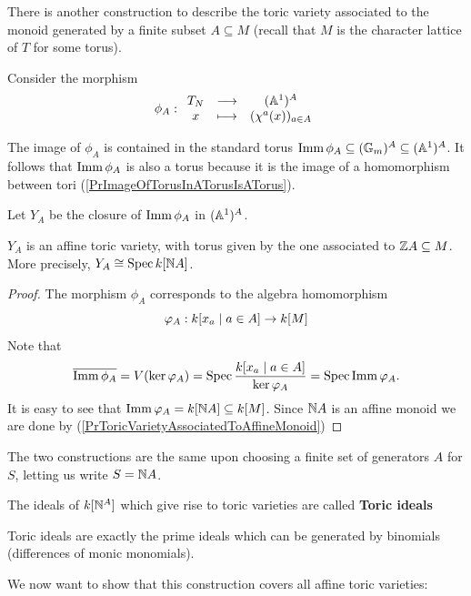 There is another construction to describe the toric variety associated to the monoid generated by a finite subset $A\subseteq M$ (recall that $M$ is the character lattice of $T$ for some torus).


Consider the morphism 
\[\phi_A:\begin{array}{ccc} {T_N} & \longrightarrow & {(\mathbb{A}^1)^A}\\ {x} & \longmapsto & {(\chi^a(x))_{a\in A}} \end{array}\]
\begin{remark}
The image of $\phi_A$ is contained in the standard torus $\operatorname{Imm} \phi_A\subseteq (\mathbb{G}_m)^A\subseteq (\mathbb{A}^1)^A$. It follows that $\operatorname{Imm} \phi_A$ is also a torus because it is the image of a homomorphism between tori (\ref{PrImageOfTorusInATorusIsATorus}).
\end{remark}

Let $Y_A$ be the closure of $\operatorname{Imm} \phi_A$ in $(\mathbb{A}^1)^A$.

\begin{proposition}[]
$Y_A$ is an affine toric variety, with torus given by the one associated to $\mathbb{Z} A\subseteq M$. More precisely, $Y_A\cong \operatorname{Spec} k[\mathbb{N} A]$.
\end{proposition}
\begin{proof}
The morphism $\phi_A$ corresponds to the algebra homomorphism
\[\varphi_A:k[x_a\mid a\in A]\to k[M]\]
Note that 
\[\overline{\operatorname{Imm} \phi_A}=V(\ker \varphi_A)=\operatorname{Spec} \frac{k[x_a\mid a\in A]}{\ker\varphi_A}=\operatorname{Spec} \operatorname{Imm} \varphi_A.\]
It is easy to see that $\operatorname{Imm} \varphi_A=k[\mathbb{N} A]\subseteq k[M]$. Since $\mathbb{N} A$ is an affine monoid we are done by (\ref{PrToricVarietyAssociatedToAffineMonoid})
\end{proof}

\begin{remark}
The two constructions are the same upon choosing a finite set of generators $A$ for $S$, letting us write $S=\mathbb{N} A$.
\end{remark}

\begin{definition}
The ideals of $k[\mathbb{N}^A]$ which give rise to toric varieties are called \textbf{Toric ideals}
\end{definition}

\begin{fact}
Toric ideals are exactly the prime ideals which can be generated by binomials (differences of monic monomials).
\end{fact}

We now want to show that this construction covers all affine toric varieties:

